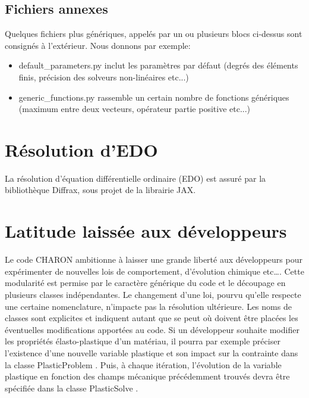 \documentclass[10pt]{book}
\begin{document}
\subsection{Fichiers annexes}
Quelques fichiers plus génériques, appelés par un ou plusieurs blocs ci-dessus sont consignés à l’extérieur. Nous donnons par exemple:
\begin{itemize}
\item default\_parameters.py inclut les paramètres par défaut (degrés des éléments finis, précision des solveurs non-linéaires etc...)
\item generic\_functions.py rassemble un certain nombre de fonctions génériques (maximum entre deux vecteurs, opérateur \og partie positive \fg{} etc...)
\end{itemize}
\section{Résolution d'EDO}
La résolution d'équation différentielle ordinaire (EDO) est assuré par la bibliothèque Diffrax, sous projet de la librairie JAX. 
\section{Latitude laissée aux développeurs}
Le code CHARON ambitionne à laisser une grande liberté aux développeurs pour expérimenter de nouvelles lois de comportement, d'évolution chimique etc\dots. Cette modularité est permise par le caractère générique du code et le découpage en plusieurs classes indépendantes. Le changement d'une loi, pourvu qu'elle respecte une certaine nomenclature, n'impacte pas la résolution ultérieure. Les noms de classes sont explicites et indiquent autant que se peut où doivent être placées les éventuelles modifications apportées au code. Si un développeur souhaite modifier les propriétés élasto-plastique d'un matériau, il pourra par exemple préciser l'existence d'une nouvelle variable plastique et son impact sur la contrainte dans la classe \og PlasticProblem \fg{}. Puis, à chaque itération, l'évolution de la variable plastique en fonction des champs mécanique précédemment trouvés devra être spécifiée dans la classe \og PlasticSolve \fg{}.
\end{document}
